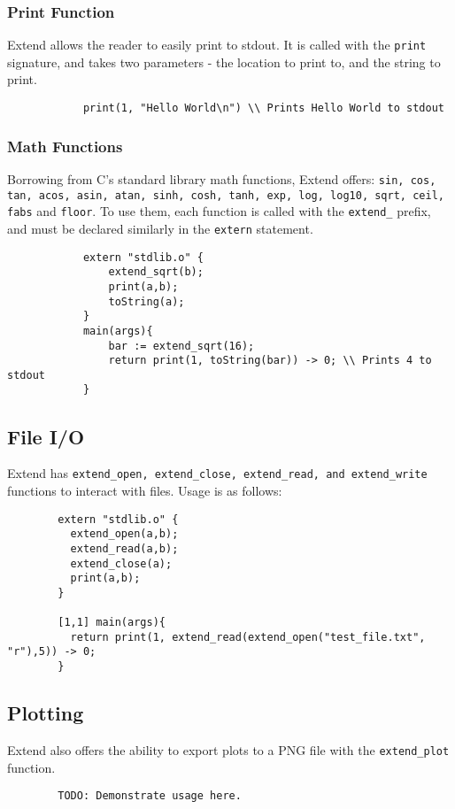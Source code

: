 		\subsubsection{Print Function}
		Extend allows the reader to easily print to stdout. It is called with the \texttt{print} signature, and takes two parameters - the location to print to, and the string to print.

		\begin{lstlisting}
			print(1, "Hello World\n") \\ Prints Hello World to stdout
		\end{lstlisting}

		\subsubsection{Math Functions}
		Borrowing from C's standard library math functions, Extend offers: \texttt{sin, cos, tan, acos, asin, atan, sinh, cosh, tanh, exp, log, log10, sqrt, ceil, fabs} and \texttt{floor}.
		To use them, each function is called with the \texttt{extend\_} prefix, and must be declared similarly in the \texttt{extern} statement.

		\begin{lstlisting}
			extern "stdlib.o" {
				extend_sqrt(b);
				print(a,b);
				toString(a);
			}
			main(args){
				bar := extend_sqrt(16);
				return print(1, toString(bar)) -> 0; \\ Prints 4 to stdout
			}
		\end{lstlisting}

	\subsection{File I/O}
	Extend has \texttt{extend\_open, extend\_close, extend\_read, and extend\_write} functions to interact with files. Usage is as follows:

	\begin{lstlisting}
		extern "stdlib.o" {
		  extend_open(a,b);
		  extend_read(a,b);
		  extend_close(a);
		  print(a,b);
		}

		[1,1] main(args){
		  return print(1, extend_read(extend_open("test_file.txt", "r"),5)) -> 0;
		}
	\end{lstlisting}

	\subsection{Plotting}
	Extend also offers the ability to export plots to a PNG file with the \texttt{extend\_plot} function.

	\begin{lstlisting}
		TODO: Demonstrate usage here.
	\end{lstlisting}
